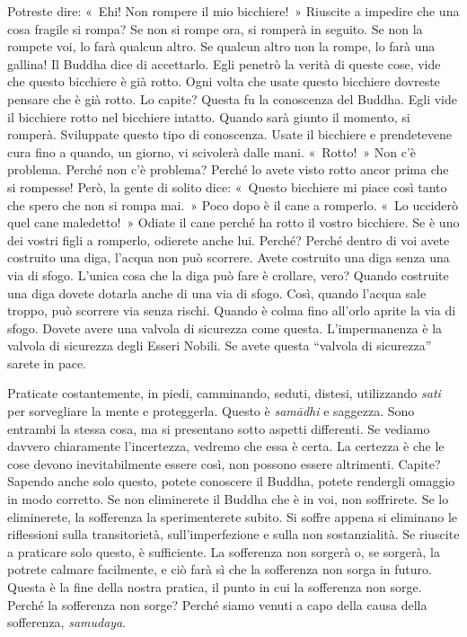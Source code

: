Potreste dire: «~Ehi! Non rompere il mio bicchiere!~» Riuscite a
impedire che una cosa fragile si rompa? Se non si rompe ora, si romperà
in seguito. Se non la rompete voi, lo farà qualcun altro. Se qualcun
altro non la rompe, lo farà una gallina! Il Buddha dice di accettarlo.
Egli penetrò la verità di queste cose, vide che questo bicchiere è già
rotto. Ogni volta che usate questo bicchiere dovreste pensare che è già
rotto. Lo capite? Questa fu la conoscenza del Buddha. Egli vide il
bicchiere rotto nel bicchiere intatto. Quando sarà giunto il momento, si
romperà. Sviluppate questo tipo di conoscenza. Usate il bicchiere e
prendetevene cura fino a quando, un giorno, vi scivolerà dalle mani.
«~Rotto!~» Non c'è problema. Perché non c'è problema? Perché lo avete
visto rotto ancor prima che si rompesse! Però, la gente di solito dice:
«~Questo bicchiere mi piace così tanto che spero che non si rompa mai.~»
Poco dopo è il cane a romperlo. «~Lo ucciderò quel cane maledetto!~»
Odiate il cane perché ha rotto il vostro bicchiere. Se è uno dei vostri
figli a romperlo, odierete anche lui. Perché? Perché dentro di voi avete
costruito una diga, l'acqua non può scorrere. Avete costruito una diga
senza una via di sfogo. L'unica cosa che la diga può fare è crollare,
vero? Quando costruite una diga dovete dotarla anche di una via di
sfogo. Così, quando l'acqua sale troppo, può scorrere via senza rischi.
Quando è colma fino all'orlo aprite la via di sfogo. Dovete avere una
valvola di sicurezza come questa. L'impermanenza è la valvola di
sicurezza degli Esseri Nobili. Se avete questa ``valvola di sicurezza''
sarete in pace.

Praticate costantemente, in piedi, camminando, seduti, distesi,
utilizzando \emph{sati} per sorvegliare la mente e proteggerla. Questo è
\emph{samādhi} e saggezza. Sono entrambi la stessa cosa, ma si
presentano sotto aspetti differenti. Se vediamo davvero chiaramente
l'incertezza, vedremo che essa è certa. La certezza è che le cose devono
inevitabilmente essere così, non possono essere altrimenti. Capite?
Sapendo anche solo questo, potete conoscere il Buddha, potete rendergli
omaggio in modo corretto. Se non eliminerete il Buddha che è in voi, non
soffrirete. Se lo eliminerete, la sofferenza la sperimenterete subito.
Si soffre appena si eliminano le riflessioni sulla transitorietà,
sull'imperfezione e sulla non sostanzialità. Se riuscite a praticare
solo questo, è sufficiente. La sofferenza non sorgerà o, se sorgerà, la
potrete calmare facilmente, e ciò farà sì che la sofferenza non sorga in
futuro. Questa è la fine della nostra pratica, il punto in cui la
sofferenza non sorge. Perché la sofferenza non sorge? Perché siamo
venuti a capo della causa della sofferenza, \emph{samudaya}.

